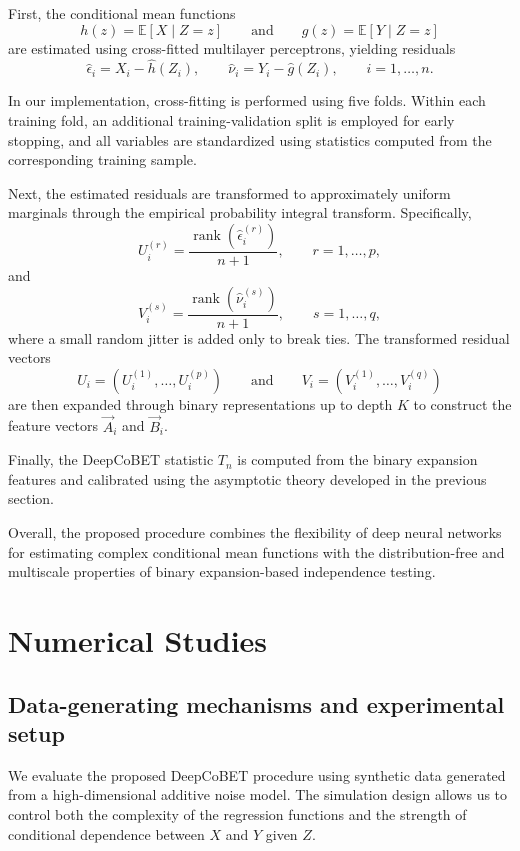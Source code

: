 \documentclass[12pt,reqno,oneside]{amsbook}
\theoremstyle{definition}
\theoremstyle{remark}
\begin{document}
First, the conditional mean functions
\[
h(z)=\mathbb E[X\mid Z=z]
\qquad\text{and}\qquad
g(z)=\mathbb E[Y\mid Z=z]
\]
are estimated using cross-fitted multilayer perceptrons, yielding residuals
\[
\hat\epsilon_i
=
X_i-\widehat h(Z_i),
\qquad
\hat\nu_i
=
Y_i-\widehat g(Z_i),
\qquad
i=1,\ldots,n.
\]

In our implementation, cross-fitting is performed using five folds. Within
each training fold, an additional training-validation split is employed for
early stopping, and all variables are standardized using statistics computed
from the corresponding training sample.

Next, the estimated residuals are transformed to approximately uniform
marginals through the empirical probability integral transform.
Specifically,
\[
U_i^{(r)}
=
\frac{\operatorname{rank}(\hat\epsilon_i^{(r)})}{n+1},
\qquad
r=1,\ldots,p,
\]
and
\[
V_i^{(s)}
=
\frac{\operatorname{rank}(\hat\nu_i^{(s)})}{n+1},
\qquad
s=1,\ldots,q,
\]
where a small random jitter is added only to break ties. The transformed
residual vectors
\[
U_i=(U_i^{(1)},\ldots,U_i^{(p)})
\qquad\text{and}\qquad
V_i=(V_i^{(1)},\ldots,V_i^{(q)})
\]
are then expanded through binary representations up to depth $K$ to construct
the feature vectors $\vec A_i$ and $\vec B_i$.

Finally, the DeepCoBET statistic $T_n$ is computed from the binary expansion
features and calibrated using the asymptotic theory developed in the previous section.

Overall, the proposed procedure combines the flexibility of deep neural
networks for estimating complex conditional mean functions with the
distribution-free and multiscale properties of binary expansion-based
independence testing.


\section{Numerical Studies}
\label{sec:sim_results_ci}

\subsection{Data-generating mechanisms and experimental setup}
\label{subsec:sim_dgm_pipeline}

We evaluate the proposed DeepCoBET procedure using synthetic data generated
from a high-dimensional additive noise model. The simulation design allows us
to control both the complexity of the regression functions and the strength of
conditional dependence between $X$ and $Y$ given $Z$.
\end{document}
